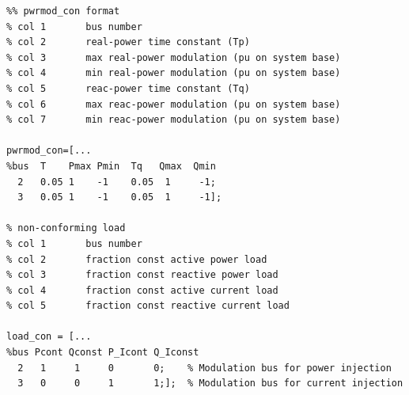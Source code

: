 \begin{lstlisting}[caption={PWRMOD Definition Example},label={lst: pwrmod example}]
\end{lstlisting}\vspace{-2 em}
\begin{verbatim}
%% pwrmod_con format
% col 1       bus number
% col 2       real-power time constant (Tp)
% col 3       max real-power modulation (pu on system base)
% col 4       min real-power modulation (pu on system base)
% col 5       reac-power time constant (Tq)
% col 6       max reac-power modulation (pu on system base)
% col 7       min reac-power modulation (pu on system base)

pwrmod_con=[...
%bus  T    Pmax Pmin  Tq   Qmax  Qmin
  2   0.05 1    -1    0.05  1     -1; 
  3   0.05 1    -1    0.05  1     -1];

% non-conforming load
% col 1       bus number
% col 2       fraction const active power load
% col 3       fraction const reactive power load
% col 4       fraction const active current load
% col 5       fraction const reactive current load

load_con = [...
%bus Pcont Qconst P_Icont Q_Iconst
  2   1     1     0       0;    % Modulation bus for power injection
  3   0     0     1       1;];  % Modulation bus for current injection
\end{verbatim}
